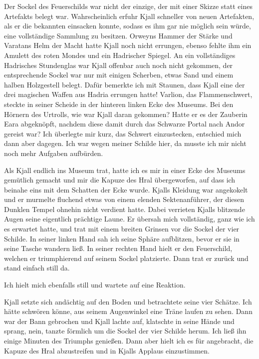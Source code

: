 Der Sockel des Feuerschilds war nicht der einzige, der mit einer Skizze statt eines Artefakts belegt war. Wahrscheinlich erfuhr Kjall schneller von neuen Artefakten, als er die bekannten einsacken konnte, sodass es ihm gar nie möglich sein würde, eine vollständige Sammlung zu besitzen. Orweyns Hammer der Stärke und Varatans Helm der Macht hatte Kjall noch nicht errungen, ebenso fehlte ihm ein Amulett des roten Mondes und ein Hadrischer Spiegel. An ein vollständiges Hadrisches Stundenglas war Kjall offenbar auch noch nicht gekommen, der entsprechende Sockel war nur mit einigen Scherben, etwas Sand und einem halben Holzgestell belegt. Dafür bemerkte ich mit Staunen, dass Kjall eine der drei magischen Waffen aus Hadria errungen hatte! Varlion, das Flammenschwert, steckte in seiner Scheide in der hinteren linken Ecke des Museums. Bei den Hörnern des Urtrolls, wie war Kjall daran gekommen? Hatte er es der Zauberin Eara abgeknöpft, nachdem diese damit durch das Schwarze Portal nach Andor gereist war? Ich überlegte mir kurz, das Schwert einzustecken, entschied mich dann aber dagegen. Ich war wegen meiner Schilde hier, da musste ich mir nicht noch mehr Aufgaben aufbürden.\bigskip



Als Kjall endlich ins Museum trat, hatte ich es mir in einer Ecke des Museums gemütlich gemacht und mir die Kapuze des Hral übergeworfen, auf dass ich beinahe eins mit dem Schatten der Ecke wurde. Kjalls Kleidung war angekokelt und er murmelte fluchend etwas von einem elenden Sektenanführer, der diesen Dunklen Tempel ohnehin nicht verdient hatte. Dabei verrieten Kjalls blitzende Augen seine eigentlich prächtige Laune. Er übersah mich vollständig, ganz wie ich es erwartet hatte, und trat mit einem breiten Grinsen vor die Sockel der vier Schilde. In seiner linken Hand sah ich seine Sphäre aufblitzen, bevor er sie in seine Tasche wandern ließ. In seiner rechten Hand hielt er den Feuerschild, welchen er triumphierend auf seinem Sockel platzierte. Dann trat er zurück und stand einfach still da.

Ich hielt mich ebenfalls still und wartete auf eine Reaktion.

Kjall setzte sich andächtig auf den Boden und betrachtete seine vier Schätze. Ich hätte schwören könne, aus seinem Augenwinkel eine Träne laufen zu sehen. Dann war der Bann gebrochen und Kjall lachte auf, klatschte in seine Hände und sprang, nein, tanzte förmlich um die Sockel der vier Schilde herum. Ich ließ ihn einige Minuten des Triumphs genießen. Dann aber hielt ich es für angebracht, die Kapuze des Hral abzustreifen und in Kjalls Applaus einzustimmen.

